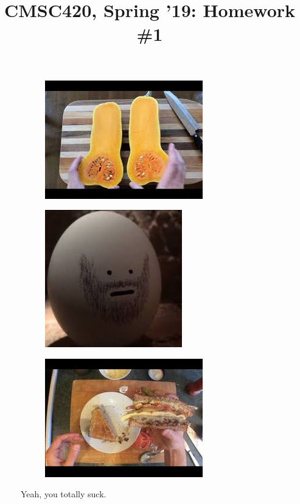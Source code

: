 \documentclass[letterpaper,12pt]{article}
\title{CMSC420, Spring '19: Homework \#1}
\begin{document}


\begin{figure}[H]
\centering
	\begin{subfigure}{.3\textwidth}
	  \centering
	  \includegraphics[width=.8\linewidth]{img/butternutSquash}
	  \caption*{}
	\end{subfigure}%
	\begin{subfigure}{.3\textwidth}
	  \centering
	  \includegraphics[width=.6\linewidth]{img/egg}
	  \caption*{}
	\end{subfigure}
		\begin{subfigure}{.3\textwidth}
	  \centering
	  \includegraphics[width=.8\linewidth]{img/sandwichOfJustice}
	  \caption*{}
	\end{subfigure}
\caption{Yeah, you totally suck.}
\label{fig:youSuckAtCooking}
\end{figure}
\end{document}
